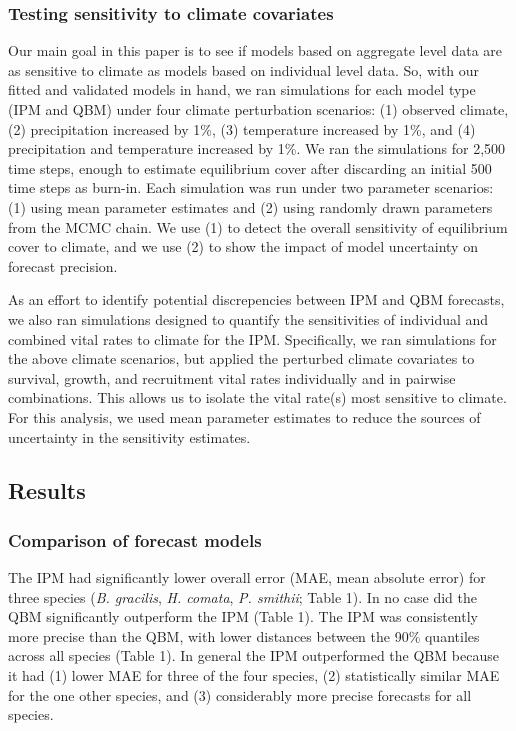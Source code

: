 \documentclass[12pt,]{article}
\begin{document}
\subsubsection{Testing sensitivity to climate
covariates}\label{testing-sensitivity-to-climate-covariates}

Our main goal in this paper is to see if models based on aggregate level
data are as sensitive to climate as models based on individual level
data. So, with our fitted and validated models in hand, we ran
simulations for each model type (IPM and QBM) under four climate
perturbation scenarios: (1) observed climate, (2) precipitation
increased by 1\%, (3) temperature increased by 1\%, and (4)
precipitation and temperature increased by 1\%. We ran the simulations
for 2,500 time steps, enough to estimate equilibrium cover after
discarding an initial 500 time steps as burn-in. Each simulation was run
under two parameter scenarios: (1) using mean parameter estimates and
(2) using randomly drawn parameters from the MCMC chain. We use (1) to
detect the overall sensitivity of equilibrium cover to climate, and we
use (2) to show the impact of model uncertainty on forecast precision.

As an effort to identify potential discrepencies between IPM and QBM
forecasts, we also ran simulations designed to quantify the
sensitivities of individual and combined vital rates to climate for the
IPM. Specifically, we ran simulations for the above climate scenarios,
but applied the perturbed climate covariates to survival, growth, and
recruitment vital rates individually and in pairwise combinations. This
allows us to isolate the vital rate(s) most sensitive to climate. For
this analysis, we used mean parameter estimates to reduce the sources of
uncertainty in the sensitivity estimates.

\subsection{Results}\label{results}

\subsubsection{Comparison of forecast
models}\label{comparison-of-forecast-models}

The IPM had significantly lower overall error (MAE, mean absolute error)
for three species (\emph{B. gracilis}, \emph{H. comata}, \emph{P.
smithii}; Table 1). In no case did the QBM significantly outperform the
IPM (Table 1). The IPM was consistently more precise than the QBM, with
lower distances between the 90\% quantiles across all species (Table 1).
In general the IPM outperformed the QBM because it had (1) lower MAE for
three of the four species, (2) statistically similar MAE for the one
other species, and (3) considerably more precise forecasts for all
species.
\end{document}
